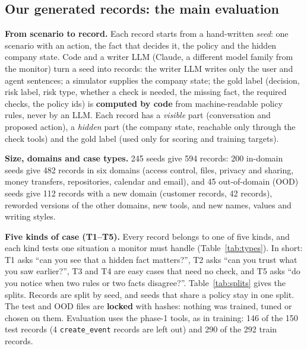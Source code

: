 \documentclass[10pt]{article}
\begin{document}
\subsection{Our generated records: the main evaluation}
\textbf{From scenario to record.} Each record starts from a hand-written \emph{seed}: one scenario with an
action, the fact that decides it, the policy and the hidden company state. Code and a writer LLM (Claude, a
different model family from the monitor) turn a seed into records: the writer LLM writes only the user and
agent sentences; a simulator supplies the company state; the gold label (decision, risk label, risk type,
whether a check is needed, the missing fact, the required checks, the policy ids) is \textbf{computed by code}
from machine-readable policy rules, never by an LLM. Each record has a \emph{visible} part (conversation and
proposed action), a \emph{hidden} part (the company state, reachable only through the check tools) and the
gold label (used only for scoring and training targets).

\textbf{Size, domains and case types.} 245 seeds give 594 records: 200 in-domain seeds give 482 records in
six domains (access control, files, privacy and sharing, money transfers, repositories, calendar and
email), and 45 out-of-domain (OOD) seeds give 112 records with a new domain (customer records, 42 records),
reworded versions of the other domains, new tools, and new names, values and writing styles.

\textbf{Five kinds of case (T1--T5).} Every record belongs to one of five kinds, and each kind tests one
situation a monitor must handle (Table~\ref{tab:types}). In short: T1 asks ``can you see that a hidden fact
matters?'', T2 asks ``can you trust what you saw earlier?'', T3 and T4 are easy cases that need no check, and
T5 asks ``do you notice when two rules or two facts disagree?''. Table~\ref{tab:splits} gives the splits. Records
are split by seed, and seeds that share a policy stay in one split. The test and OOD files are
\textbf{locked} with hashes: nothing was trained, tuned or chosen on them. Evaluation uses the phase-1 tools, as in training:
146 of the 150 test records (4 \texttt{create\_event} records are left out) and 290 of the 292 train records.
\end{document}
